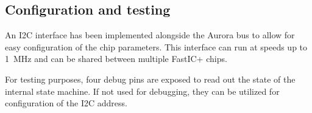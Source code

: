 \subsection{Configuration and testing}
An I2C interface has been implemented alongside the Aurora bus to allow for easy configuration of the chip parameters. This interface can run at speeds up to \SI{1}{\mega\hertz} and can be shared between multiple FastIC+ chips. 

For testing purposes, four debug pins are exposed to read out the state of the internal state machine. If not used for debugging, they can be utilized for configuration of the I2C address. 
